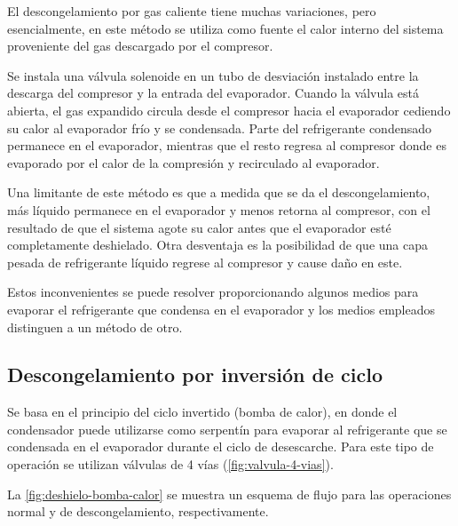 		El descongelamiento por gas caliente tiene muchas variaciones, pero esencialmente, en este método se utiliza como fuente el calor interno del sistema proveniente del gas descargado por el compresor. 
		
		
		Se instala una válvula solenoide en un tubo de desviación instalado entre la descarga del compresor y la entrada del evaporador. Cuando la válvula está abierta, el gas expandido circula desde el compresor hacia el evaporador cediendo su calor al evaporador frío y se condensada. Parte del refrigerante condensado permanece en el evaporador, mientras que el resto regresa al compresor donde es evaporado por el calor de la compresión y recirculado al evaporador. 
		
		
		Una limitante de este método es que a medida que se da el descongelamiento, más líquido permanece en el evaporador y menos retorna al compresor, con el resultado de que el sistema agote su calor antes que el evaporador esté completamente deshielado. Otra desventaja es la posibilidad de que una capa pesada de refrigerante líquido regrese al compresor y cause daño en este.
		
		Estos inconvenientes se puede resolver proporcionando algunos medios para evaporar el refrigerante que condensa en el evaporador y los medios empleados distinguen a un método de otro.
		
		\subsection{Descongelamiento por inversión de ciclo}
		
		Se basa en el principio del ciclo invertido (bomba de calor), en donde el condensador puede utilizarse como serpentín para evaporar al refrigerante que se condensada en el evaporador durante el ciclo de desescarche. Para este tipo de operación se utilizan válvulas de 4 vías (\autoref{fig:valvula-4-vias}).
		
		La \autoref{fig:deshielo-bomba-calor} se muestra un esquema de flujo para las operaciones normal y de descongelamiento, respectivamente.
%		
%			
		
